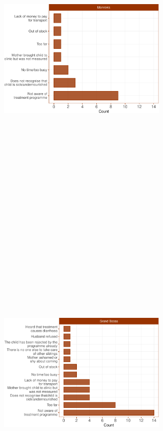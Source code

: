 \documentclass[12pt,a4paper]{article}
\theoremstyle{definition}
\theoremstyle{definition}
\theoremstyle{definition}
\theoremstyle{remark}
\begin{document}
\begin{figure}[H]

{\centering \includegraphics[width=8cm,height=16cm]{liberiaCoverageReport_files/figure-latex/cmam3-1} \includegraphics[width=8cm,height=16cm]{liberiaCoverageReport_files/figure-latex/cmam3-2} 

}
\end{figure}
\end{document}
